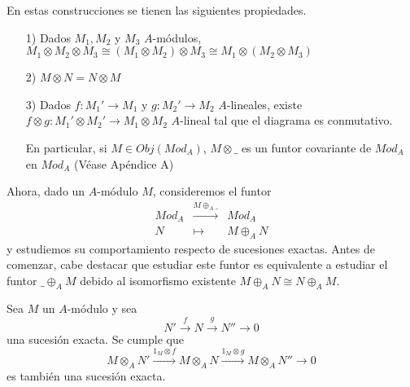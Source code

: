 \documentclass[../main.tex]{subfiles}
\begin{document}
En estas construcciones se tienen las siguientes propiedades.
\begin{itemize}
    \item [1)] Dados $M_1,M_2$ y $M_3$ $A$-módulos, $M_1\otimes  M_2\otimes M_3\cong(M_1\otimes  M_2)\otimes  M_3\cong M_1\otimes (M_2\otimes  M_3)$
    \item [2)] $M\otimes N=N\otimes M$
    \item [3)] Dados $f:M_1'\to M_1$ y $g:M_2'\to M_2$ $A$-lineales, existe $f\otimes g:M_1'\otimes  M_2'\rightarrow M_1\otimes M_2$ $A$-lineal tal que el diagrama es conmutativo.

    En particular, si $M\in Obj(Mod_A)$, $M\otimes\_$ es un funtor covariante de $Mod_A$ en $Mod_A$ (Véase Apéndice A)
\end{itemize}

Ahora, dado un $A$-módulo $M$, consideremos el funtor
$$\begin{array}{rcl}
Mod_A&\overset{M\oplus_A\_}{\longrightarrow}&Mod_A\\
N&\longmapsto&M\oplus_A N
\end{array}$$
y estudiemos su comportamiento respecto de sucesiones exactas. Antes de comenzar, cabe destacar que estudiar este funtor es equivalente a estudiar el funtor $\_\oplus_A M$ debido al isomorfismo existente $M\oplus_A N\cong N\oplus_A M$.

\begin{proposition}
	Sea $M$ un $A$-módulo y sea \begin{equation}\label{equation: ext1}
	N'\overset{f}{\longrightarrow}N\overset{g}{\longrightarrow}N''\longrightarrow 0
	\end{equation}una sucesión exacta. Se cumple que \begin{equation}\label{equation: ext2}
	M\otimes_A N'\overset{1_M\otimes f}{\longrightarrow}M\otimes_A N\overset{1_M\otimes g}{\longrightarrow}M\otimes_A N''\longrightarrow 0
	\end{equation} es también una sucesión exacta.
\end{proposition}
\end{document}
